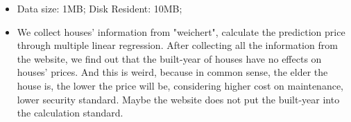 {\begin{itemize}
\begin{itemize} 
\item{}
	Data size: 1MB;  Disk Resident: 10MB;  
\item{}
	 We collect houses' information from "weichert", calculate the prediction price through multiple linear regression.
	 After collecting all the information from the website, we find out that the built-year of houses have no effects on houses' prices. And this is weird, because in common sense, the elder the house is, the lower the price will be, considering higher cost on maintenance, lower security standard. Maybe the website does not put the built-year into the calculation standard.
\end{itemize}
\end{itemize}
}
